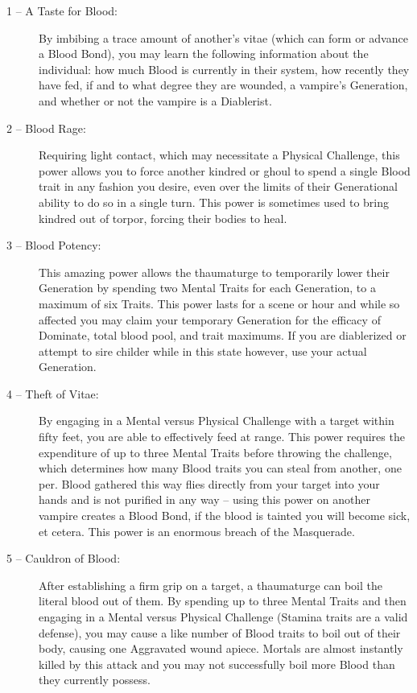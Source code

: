 \begin{description}
	\item[1 -- A Taste for Blood:]  By imbibing a trace amount of another's vitae (which can form 
	or advance a Blood Bond), you may learn the following information about the individual:  
	how much Blood is currently in their system, how recently they have fed, if and to what degree 
	they are wounded, a vampire's Generation, and whether or not the vampire is a Diablerist.
	\item[2 -- Blood Rage:]  Requiring light contact, which may necessitate a Physical Challenge, this 
	power allows you to force another kindred or ghoul to spend a single Blood trait in any fashion 
	you desire, even over the limits of their Generational ability to do so in a single turn.  This 
	power is sometimes used to bring kindred out of torpor, forcing their bodies to heal.
	\item[3 -- Blood Potency:]  This amazing power allows the thaumaturge to temporarily lower their 
	Generation by spending two Mental Traits for each Generation, to a maximum of six Traits.  This 
	power lasts for a scene or hour and while so affected you may claim your temporary Generation for 
	the efficacy of Dominate, total blood pool, and trait maximums.  If you are diablerized or attempt 
	to sire childer while in this state however, use your actual Generation.
	\item[4 -- Theft of Vitae:]  By engaging in a Mental versus Physical Challenge with a target within 
	fifty feet, you are able to effectively feed at range.  This power requires the expenditure of up 
	to three Mental Traits before throwing the challenge, which determines how many Blood traits you 
	can steal from another, one per.  Blood gathered this way flies directly from your target into your 
	hands and is not purified in any way -- using this power on another vampire creates a Blood Bond, if 
	the blood is tainted you will become sick, et cetera.  This power is an enormous breach of the Masquerade.
	\item[5 -- Cauldron of Blood:]  After establishing a firm grip on a target, a thaumaturge can boil 
	the literal blood out of them.  By spending up to three Mental Traits and then engaging in a Mental 
	versus Physical Challenge (Stamina traits are a valid defense), you may cause a like number of Blood 
	traits to boil out of their body, causing one Aggravated wound apiece.  Mortals are almost instantly 
	killed by this attack and you may not successfully boil more Blood than they currently possess.
\end{description}

